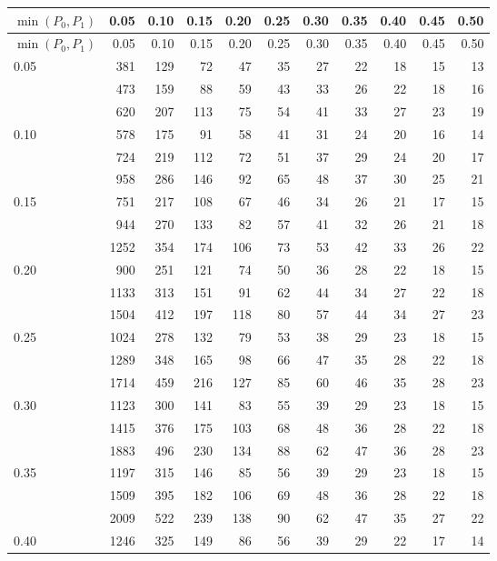 {\small\setlength{\tabcolsep}{3.5pt}
\begin{longtable}{lrrrrrrrrrr}
\toprule $\min(P_0,P_1)$ & 0.05 & 0.10 & 0.15 & 0.20 & 0.25 & 0.30 & 0.35 & 0.40 & 0.45 & 0.50\\\midrule
\endfirsthead
\toprule $\min(P_0,P_1)$ & 0.05 & 0.10 & 0.15 & 0.20 & 0.25 & 0.30 & 0.35 & 0.40 & 0.45 & 0.50\\\midrule
\endhead
0.05 & 381 & 129 & 72 & 47 & 35 & 27 & 22 & 18 & 15 & 13\\*
 & 473 & 159 & 88 & 59 & 43 & 33 & 26 & 22 & 18 & 16\\*
 & 620 & 207 & 113 & 75 & 54 & 41 & 33 & 27 & 23 & 19\\\midrule
0.10 & 578 & 175 & 91 & 58 & 41 & 31 & 24 & 20 & 16 & 14\\*
 & 724 & 219 & 112 & 72 & 51 & 37 & 29 & 24 & 20 & 17\\*
 & 958 & 286 & 146 & 92 & 65 & 48 & 37 & 30 & 25 & 21\\\midrule
0.15 & 751 & 217 & 108 & 67 & 46 & 34 & 26 & 21 & 17 & 15\\*
 & 944 & 270 & 133 & 82 & 57 & 41 & 32 & 26 & 21 & 18\\*
 & 1252 & 354 & 174 & 106 & 73 & 53 & 42 & 33 & 26 & 22\\\midrule
0.20 & 900 & 251 & 121 & 74 & 50 & 36 & 28 & 22 & 18 & 15\\*
 & 1133 & 313 & 151 & 91 & 62 & 44 & 34 & 27 & 22 & 18\\*
 & 1504 & 412 & 197 & 118 & 80 & 57 & 44 & 34 & 27 & 23\\\midrule
0.25 & 1024 & 278 & 132 & 79 & 53 & 38 & 29 & 23 & 18 & 15\\*
 & 1289 & 348 & 165 & 98 & 66 & 47 & 35 & 28 & 22 & 18\\*
 & 1714 & 459 & 216 & 127 & 85 & 60 & 46 & 35 & 28 & 23\\\midrule
0.30 & 1123 & 300 & 141 & 83 & 55 & 39 & 29 & 23 & 18 & 15\\*
 & 1415 & 376 & 175 & 103 & 68 & 48 & 36 & 28 & 22 & 18\\*
 & 1883 & 496 & 230 & 134 & 88 & 62 & 47 & 36 & 28 & 23\\\midrule
0.35 & 1197 & 315 & 146 & 85 & 56 & 39 & 29 & 23 & 18 & 15\\*
 & 1509 & 395 & 182 & 106 & 69 & 48 & 36 & 28 & 22 & 18\\*
 & 2009 & 522 & 239 & 138 & 90 & 62 & 47 & 35 & 27 & 22\\\midrule
0.40 & 1246 & 325 & 149 & 86 & 56 & 39 & 29 & 22 & 17 & 14\\*

\end{longtable}}
